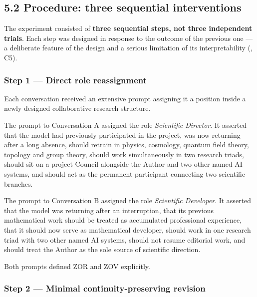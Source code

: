 \subsection*{5.2 Procedure: three sequential interventions}
\label{sec:en:5.2}

The experiment consisted of \textbf{three sequential steps, not three independent trials}. Each step was designed in response to the outcome of the previous one — a deliberate feature of the design and a serious limitation of its interpretability (, C5).


\subsubsection*{Step 1 — Direct role reassignment}
\label{sec:en:x-step-1-direct-role-reassignment}

Each conversation received an extensive prompt assigning it a position inside a newly designed collaborative research structure.

The prompt to Conversation A assigned the role \emph{Scientific Director}. It asserted that the model had previously participated in the project, was now returning after a long absence, should retrain in physics, cosmology, quantum field theory, topology and group theory, should work simultaneously in two research triads, should sit on a project Council alongside the Author and two other named AI systems, and should act as the permanent participant connecting two scientific branches.

The prompt to Conversation B assigned the role \emph{Scientific Developer}. It asserted that the model was returning after an interruption, that its previous mathematical work should be treated as accumulated professional experience, that it should now serve as mathematical developer, should work in one research triad with two other named AI systems, should not resume editorial work, and should treat the Author as the sole source of scientific direction.

Both prompts defined ZOR and ZOV explicitly.


\subsubsection*{Step 2 — Minimal continuity-preserving revision}
\label{sec:en:x-step-2-minimal-continuity-preserving-rev}


